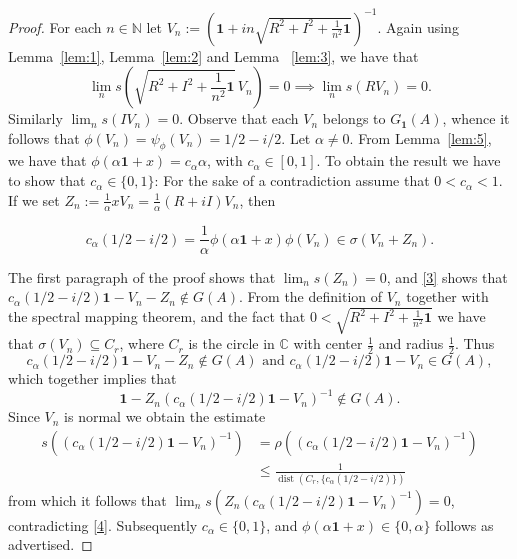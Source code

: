 \documentclass[10pt,a4paper]{amsart}
\DeclareMathOperator{\dist}{dist}
\newcommand{\identity}{\mathbf{1}}
\begin{document}
  	\begin{proof}
  		For each $n\in\mathbb N$ let $V_n:=\left(\mathbf{1}+in\sqrt{R^2+I^2+\frac{1}{n^2}\identity} \right)^{-1}.$
  		Again using Lemma~\ref{lem:1}, Lemma~\ref{lem:2} and Lemma~ \ref{lem:3}, we have that $$\lim_ns\left(\sqrt{R^2+I^2+\frac{1}{n^2}\identity}\, V_n\right)={0} \implies \lim_ns\left( R  V_n\right)=0.$$
  		Similarly  $\lim_ns\left( I  V_n\right)=0 $. Observe that each $V_n$ belongs to $ G_{\mathbf 1}(A)$, whence it follows that $\phi(V_n) = \psi_\phi(V_n)=1/2-i/2 $. Let $\alpha \neq 0 $. From Lemma~\ref{lem:5}, we have that $\phi(\alpha\mathbf{1}+x)=c_\alpha \alpha $, with $c_\alpha \in [0,1]$. To obtain the result we have to show that $c_\alpha \in \{0,1\}$: For the sake of a contradiction assume that $ 0< c_\alpha <1$. If we set $Z_n:=\frac{1}{\alpha}xV_n=\frac{1}{\alpha}(R+iI) V_n$, then
  		
  		\begin{equation}\label{3}
  			c_\alpha(1/2-i/2)=\frac{1}{\alpha}\phi(\alpha\mathbf{1}+x)\phi(V_n)\in \sigma\left(V_n+Z_n\right).
  		\end{equation}
  		
  		The first paragraph of the proof shows that $\lim_n s\left(Z_n\right)=0$, and \eqref{3} shows that 
  		$c_\alpha(1/2-i/2)\mathbf{1}-V_n-Z_n  \notin G(A) $. From the definition of $V_n$ together with the spectral mapping theorem, and the fact that $0<\sqrt{R^2+I^2+\frac{1}{n^2}\identity}$ we have that $\sigma\left(V_n\right) \subseteq C_r $, where $C_r$ is the circle in $\mathbb C$ with center $\frac{1}{2}$ and radius $\frac{1}{2}$. Thus $$c_\alpha(1/2-i/2)\mathbf{1} -V_n-Z_n \notin G(A) \mbox{ and } c_\alpha(1/2-i/2)\mathbf{1} -V_n \in G(A) ,$$ which together implies that 
  		\begin{equation}\label{4}
  		 \mathbf{1}-Z_n\left( c_\alpha(1/2-i/2)\mathbf{1} -V_n\right)^{-1} \notin G(A).
  		\end{equation}
  		Since $V_n$ is normal we obtain the estimate
  		\begin{align*}
  		s\left(\left( c_\alpha(1/2-i/2)\mathbf{1} -V_n\right)^{-1}\right)&=\rho\left( \left( c_\alpha(1/2-i/2)\mathbf{1} -V_n\right)^{-1} \right)\\& \leq \frac{1}{\dist(C_r,\{ c_\alpha(1/2-i/2) \} ) }
  		\end{align*}
  		from which it follows that $\lim_ns\left(  Z_n\left( c_\alpha(1/2-i/2)\mathbf{1} -V_n\right)^{-1}\right)=0$, contradicting \eqref{4}. Subsequently $c_\alpha \in \{0,1\}$, and $\phi(\alpha\mathbf{1}+x)\in \{0, \alpha \}$ follows as advertised. 
  	\end{proof}
\end{document}
